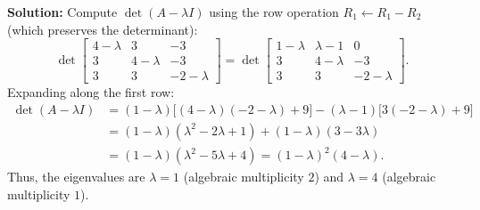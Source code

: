 \documentclass[11pt, letterpaper]{article}
\theoremstyle{definition}
\theoremstyle{remark}
\begin{document}
\textbf{Solution:}
Compute $\det(A - \lambda I)$ using the row operation $R_{1} \leftarrow R_{1} - R_{2}$ (which preserves the determinant):
\[
\det\begin{bmatrix} 4 - \lambda & 3 & -3 \\ 3 & 4 - \lambda & -3 \\ 3 & 3 & -2 - \lambda \end{bmatrix}
= \det\begin{bmatrix} 1 - \lambda & \lambda - 1 & 0 \\ 3 & 4 - \lambda & -3 \\ 3 & 3 & -2 - \lambda \end{bmatrix}.
\]
Expanding along the first row:
\begin{align*}
\det(A - \lambda I) &= (1 - \lambda)\bigl[(4-\lambda)(-2-\lambda) + 9\bigr] - (\lambda - 1)\bigl[3(-2-\lambda) + 9\bigr] \\
&= (1 - \lambda)(\lambda^{2} - 2\lambda + 1) + (1 - \lambda)(3 - 3\lambda) \\
&= (1 - \lambda)(\lambda^{2} - 5\lambda + 4) = (1 - \lambda)^{2}(4 - \lambda).
\end{align*}
Thus, the eigenvalues are $\lambda = 1$ (algebraic multiplicity $2$) and $\lambda = 4$ (algebraic multiplicity $1$).
\end{document}
